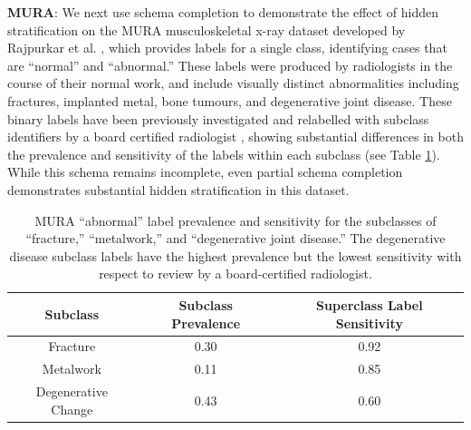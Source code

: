 \documentclass{article}
\begin{document}
\textbf{MURA}: We next use schema completion to demonstrate the effect of hidden stratification on the MURA musculoskeletal x-ray dataset developed by Rajpurkar et al. \citep{Rajpurkar2017-rc}, which provides labels for a single class, identifying cases that are ``normal'' and ``abnormal.'' 
These labels were produced by radiologists in the course of their normal work, and include visually distinct abnormalities including fractures, implanted metal, bone tumours, and degenerative joint disease. 
These binary labels have been previously investigated and relabelled with subclass identifiers by a board certified radiologist \citep{Oakden-Rayner2019-yi}, showing substantial differences in both the prevalence and sensitivity of the labels within each subclass (see Table \ref{tab:mura2}). 
While this schema remains incomplete, even partial schema completion demonstrates substantial hidden stratification in this dataset.

\begin{table}[]
\centering
\begin{tabular}{|c|c|c|}
 \hline
 Subclass & Subclass Prevalence & Superclass Label Sensitivity \\
 \hline
 Fracture & 0.30 & 0.92   \\
 Metalwork & 0.11 & 0.85    \\
 Degenerative Change & 0.43 & 0.60 \\
 \hline
\end{tabular}
\caption{MURA ``abnormal'' label prevalence and sensitivity for the subclasses of ``fracture,'' ``metalwork,'' and ``degenerative joint disease.'' The degenerative disease subclass labels have the highest prevalence but the lowest sensitivity with respect to review by a board-certified radiologist.}
\label{tab:mura2}
\vspace{-6mm}
\end{table}
\end{document}
